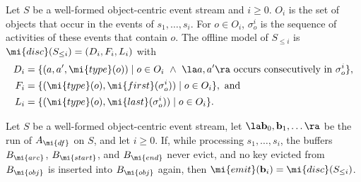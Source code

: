 \begin{definition}
\label{def:offline}
Let $S$ be a well-formed object-centric event stream and $i \ge 0$.
$O_i$ is the set of objects that occur in the events of $s_1, \dots, s_i$.
For $o \in O_i$, $\sigma_o^i$ is the sequence of activities of these events
that contain $o$.
The offline model of $S_{\le i}$ is $\mi{disc}(S_{\le i}) = (D_i, F_i, L_i)$ with
\begin{align*}
  D_i &= \{(a, a', \mi{type}(o)) \mid o \in O_i \ \wedge\
        \la a, a' \ra \text{ occurs consecutively in } \sigma_o^i\},\\
  F_i &= \{(\mi{type}(o), \mi{first}(\sigma_o^i)) \mid o \in O_i\},
  \text{ and}\\
  L_i &= \{(\mi{type}(o), \mi{last}(\sigma_o^i)) \mid o \in O_i\}.
\end{align*}
\end{definition}

\begin{proposition}[Correctness of $A_{\mi{df}}$]
\label{prop:dfg}
Let $S$ be a well-formed object-centric event stream, let
$\la \mathbf{b}_0, \mathbf{b}_1, \dots \ra$ be the run of $A_{\mi{df}}$ on $S$,
and let $i \ge 0$.
If, while processing $s_1, \dots, s_i$, the buffers $B_{\mi{arc}}$,
$B_{\mi{start}}$, and $B_{\mi{end}}$ never evict, and no key evicted from
$B_{\mi{obj}}$ is inserted into $B_{\mi{obj}}$ again, then
$\mi{emit}(\mathbf{b}_i) = \mi{disc}(S_{\le i})$.
\end{proposition}

